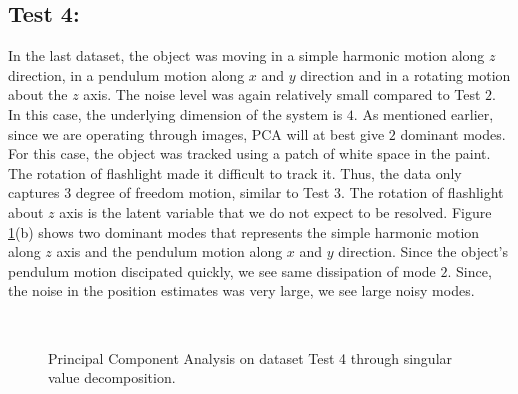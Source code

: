 \documentclass{article}
\begin{document}
\subsection{Test 4:}
In the last dataset, the object was moving in a simple harmonic motion along $z$ direction, in a pendulum motion along $x$ and $y$ direction and in a rotating motion about the $z$ axis. The noise level was again relatively small compared to Test $2$. In this case, the underlying dimension of the system is $4$. As mentioned earlier, since we are operating through images, PCA will at best give $2$ dominant modes. For this case, the object was tracked using a patch of white space in the paint. The rotation of flashlight made it difficult to track it. Thus, the data only captures $3$ degree of freedom motion, similar to Test $3$. The rotation of flashlight about $z$ axis is the latent variable that we do not expect to be resolved. Figure \ref{fig:test4}(b) shows two dominant modes that represents the simple harmonic motion along $z$ axis and the pendulum motion along $x$ and $y$ direction. Since the object's pendulum motion discipated quickly, we see same dissipation of mode $2$. Since, the noise in the position estimates was very large, we see large noisy modes.

\begin{figure}[!b]
\\
\caption{Principal Component Analysis on dataset Test 4 through singular value decomposition.}
\label{fig:test4}
\end{figure}

\pagebreak
\end{document}

